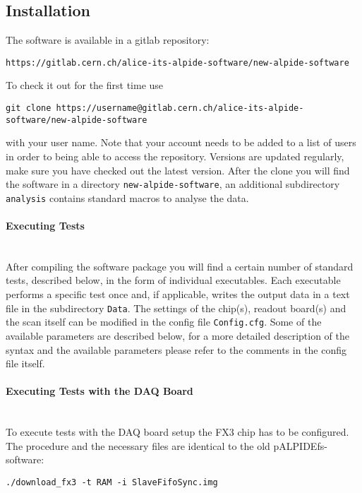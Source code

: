 \documentclass{article}
\begin{document}
\subsection{Installation}
The software is available in a gitlab repository:

\begin{lstlisting}
https://gitlab.cern.ch/alice-its-alpide-software/new-alpide-software
\end{lstlisting}

To check it out for the first time use

\begin{lstlisting}
git clone https://username@gitlab.cern.ch/alice-its-alpide-software/new-alpide-software
\end{lstlisting}

with your user name. Note that your account needs to be added to a
list of users in order to being able to access the repository.
Versions are updated regularly, make sure you have checked out the
latest version. After the clone you will find the software in a directory \texttt{new-alpide-software}, an additional subdirectory \texttt{analysis} contains standard macros to analyse the data.

\paragraph{Executing Tests}\hfill \\
After compiling the software package you will find a certain number of standard tests, described below, in the form of individual executables. Each executable performs a specific test once and, if applicable, writes the output data in a text file in the subdirectory \texttt{Data}. The settings of the chip(s), readout board(s) and the scan itself can be modified in the config file \texttt{Config.cfg}. Some of the available parameters are described below, for a more detailed description of the syntax and the available parameters please refer to the comments in the config file itself.

\paragraph{Executing Tests with the DAQ Board}\hfill \\
To execute tests with the DAQ board setup the FX3 chip has to be configured. The procedure and the necessary files are identical to the old pALPIDEfs-software:
\begin{verbatim}
./download_fx3 -t RAM -i SlaveFifoSync.img
\end{verbatim}
\end{document}
